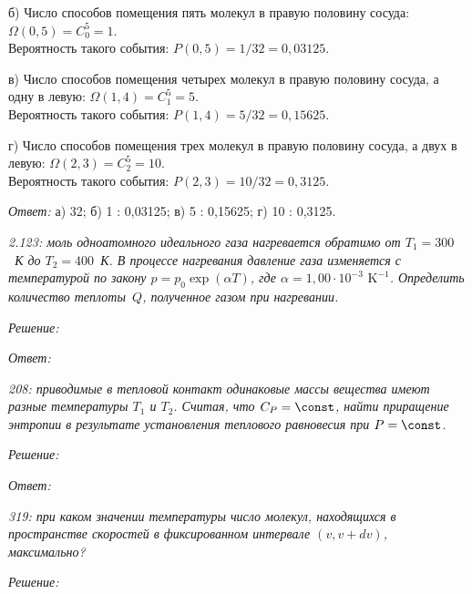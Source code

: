 б) Число способов помещения пять молекул в правую половину сосуда:
\( \Omega(0, 5) = C_0^5 = 1 \).\\
Вероятность такого события: \( P(0, 5) = 1/32 = 0,\!03125 \).

в) Число способов помещения четырех молекул в правую половину сосуда, а одну в
левую: \( \Omega(1, 4) = C_1^5 = 5 \).\\
Вероятность такого события: \( P(1, 4) = 5/32 = 0,\!15625 \).

г) Число способов помещения трех молекул в правую половину сосуда, а двух в
левую: \( \Omega(2, 3) = C_2^5 = 10 \).\\
Вероятность такого события: \( P(2, 3) = 10/32 = 0,\!3125 \).

\vspace*{2em}
\emph{Ответ:} а) 32; б) 1 : 0,03125; в) 5 : 0,15625; г) 10 : 0,3125.

\newpage %

\emph{2.123: моль одноатомного идеального газа нагревается обратимо от
\( T_1 = 300 \)~К до \( T_2 = 400 \)~К. В процессе нагревания давление газа
изменяется с температурой по закону \( p = p_0 \exp(\alpha T) \), где
\( \alpha = 1,\!00 \cdot 10^{-3} \text{ K}^{-1} \). Определить количество
теплоты~\( Q \), полученное газом при нагревании.}

\vspace*{2em}
\emph{Решение:}

\vspace*{2em}
\emph{Ответ:}

\newpage %

\emph{208: приводимые в тепловой контакт одинаковые массы вещества имеют разные
температуры \( T_1 \) и \( T_2 \). Считая, что \( C_P = \const \), найти
приращение энтропии в результате установления теплового равновесия при
\( P = \const \).}

\vspace*{2em}
\emph{Решение:}

\vspace*{2em}
\emph{Ответ:}

\newpage %

\emph{319: при каком значении температуры число молекул, находящихся в
пространстве скоростей в фиксированном интервале \( (v, v + dv) \), максимально?}

\vspace*{2em}
\emph{Решение:}

